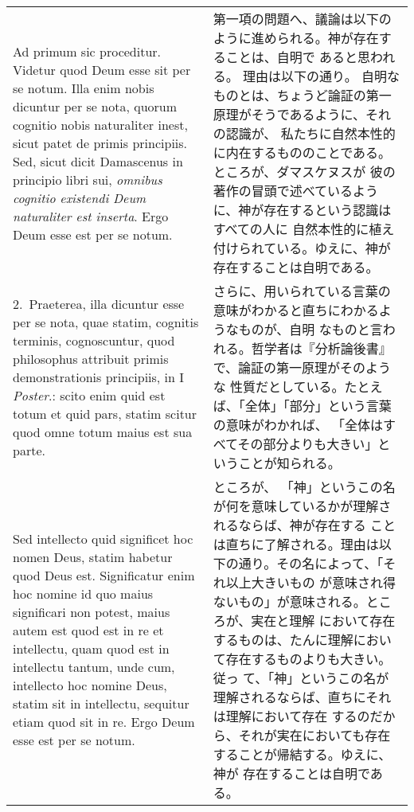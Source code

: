 \documentclass[10pt]{jsarticle} %
\begin{document}
\begin{longtable}{p{21em}p{21em}}

{\huge A}{\sc d primum sic proceditur}. Videtur quod Deum
esse sit per se notum. Illa enim nobis dicuntur per se nota, quorum
cognitio nobis naturaliter inest, sicut patet de primis principiis. Sed,
sicut dicit Damascenus in principio libri sui, {\it omnibus cognitio
existendi Deum naturaliter est inserta}. Ergo Deum esse est per se notum.


&

第一項の問題へ、議論は以下のように進められる。神が存在することは、自明で
 あると思われる。
理由は以下の通り。
自明なものとは、ちょうど論証の第一原理がそうであるように、それの認識が、
 私たちに自然本性的に内在するもののことである。ところが、ダマスケヌスが
 彼の著作の冒頭で述べているように、神が存在するという認識はすべての人に
 自然本性的に植え付けられている。ゆえに、神が存在することは自明である。


\\


2.~{\sc Praeterea}, illa dicuntur esse per se nota,
quae statim, cognitis terminis, cognoscuntur, quod philosophus attribuit
primis demonstrationis principiis, in I {\it Poster}.: scito enim quid est
totum et quid pars, statim scitur quod omne totum maius est sua
parte. 

&

さらに、用いられている言葉の意味がわかると直ちにわかるようなものが、自明
 なものと言われる。哲学者は『分析論後書』で、論証の第一原理がそのような
 性質だとしている。たとえば、「全体」「部分」という言葉の意味がわかれば、
 「全体はすべてその部分よりも大きい」ということが知られる。

\\

Sed intellecto quid significet hoc nomen Deus, statim habetur
quod Deus est. Significatur enim hoc nomine id quo maius significari non
potest, maius autem est quod est in re et intellectu, quam quod est in
intellectu tantum, unde cum, intellecto hoc nomine Deus, statim sit in
intellectu, sequitur etiam quod sit in re. Ergo Deum esse est per se
notum.


&
ところが、
 「神」というこの名が何を意味しているかが理解されるならば、神が存在する
 ことは直ちに了解される。理由は以下の通り。その名によって、「それ以上大きいもの
 が意味され得ないもの」が意味される。ところが、実在と理解
 において存在するものは、たんに理解において存在するものよりも大きい。従っ
 て、「神」というこの名が理解されるならば、直ちにそれは理解において存在
 するのだから、それが実在においても存在することが帰結する。ゆえに、神が
 存在することは自明である。


\end{longtable}
\end{document}
